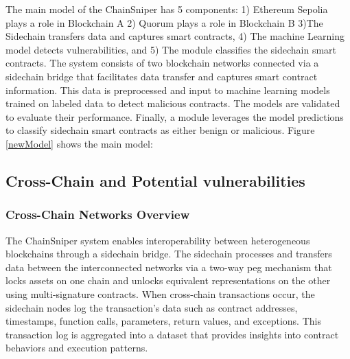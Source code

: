\documentclass[sigconf]{acmart}
\begin{document}
The main model of the ChainSniper has 5 components: 1) Ethereum Sepolia plays a role in Blockchain A 2) Quorum plays a role in Blockchain B 3)The Sidechain transfers data and captures smart contracts, 4) The machine Learning model detects vulnerabilities, and 5) The module classifies the sidechain smart contracts. The system consists of two blockchain networks connected via a sidechain bridge that facilitates data transfer and captures smart contract information. This data is preprocessed and input to machine learning models trained on labeled data to detect malicious contracts. The models are validated to evaluate their performance. Finally, a module leverages the model predictions to classify sidechain smart contracts as either benign or malicious. Figure \ref{newModel} shows the main model:

\subsection{Cross-Chain and Potential vulnerabilities}
\subsubsection{Cross-Chain Networks Overview}
The ChainSniper system enables interoperability between heterogeneous blockchains through a sidechain bridge. The sidechain processes and transfers data between the interconnected networks via a two-way peg mechanism that locks assets on one chain and unlocks equivalent representations on the other using multi-signature contracts. When cross-chain transactions occur, the sidechain nodes log the transaction's data such as contract addresses, timestamps, function calls, parameters, return values, and exceptions. This transaction log is aggregated into a dataset that provides insights into contract behaviors and execution patterns.
\end{document}
